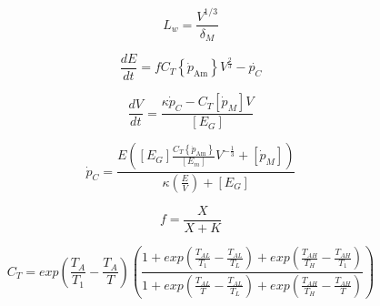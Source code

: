 \documentclass[10pt,a4paper]{article}
\begin{document}
\begin{equation}
	L_{w} = \frac
				{V^{1/3}}
				{\delta_{M}}
	\label{L_W}
\end{equation}

\begin{equation}
	\frac{dE}{dt} = f C_{T} \left \{ \dot{p}_\mathrm{Am} \right \} V^{\frac{2}{3}} - \dot{p_C}
\end{equation}

\begin{equation}
	\frac{dV}{dt} = \frac
						{\kappa \dot{p}_C - C_{T} \left [ \dot{p}_{M} \right ] V}
						{\left [ E_{G} \right ]}
\end{equation}

\begin{equation}
	\dot{p}_{C} = \frac
					   {E\left ( \left [ E_{G} \right ] \frac{C_{T}\left \{ \dot{p}_\mathrm{Am} \right \}}{\left [ E_{m} \right ]} V^{-\frac{1}{3}}+\left [ \dot{p}_{M} \right ]\right )}
					   {\kappa\left ( \frac{E}{V} \right ) + \left [ E_{G} \right ]}
\end{equation}

\begin{equation}
	f = \frac{X}
			 {X+K}
    \label{funct_response}
\end{equation}

\begin{equation}
	C_{T} = exp\left ( \frac{T_{A}}{T_{1}} - \frac{T_{A}}{T} \right )
	\left ( \frac
				{1+exp\left ( \frac{T_{AL}}{T_{1}} - \frac{T_{AL}}{T_{L}} \right )
				  +exp\left ( \frac{T_{AH}}{T_{H}} - \frac{T_{AH}}{T_{1}} \right )}
				{1+exp\left ( \frac{T_{AL}}{T} - \frac{T_{AL}}{T_{L}} \right )
				  +exp\left ( \frac{T_{AH}}{T_{H}} - \frac{T_{AH}}{T} \right )}
	\right )
    \label{C_T}
\end{equation}
\end{document}
